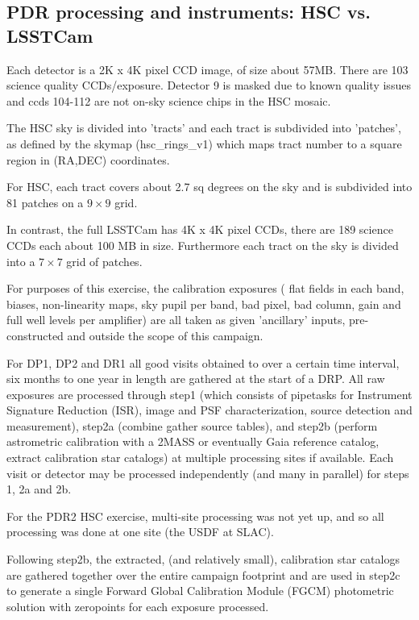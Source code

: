 \subsection{PDR processing and instruments: HSC vs. LSSTCam}

Each detector is a 2K x 4K pixel CCD image, of size about 57MB.
There are 103 science quality CCDs/exposure.  Detector 9 is masked due
to known quality issues and ccds 104-112 are not on-sky science chips in
the HSC mosaic.

The HSC sky is divided into 'tracts' and each tract is subdivided 
into 'patches', as defined by the skymap (hsc\_rings\_v1) which maps 
tract number to a square region in (RA,DEC) coordinates.

For HSC, each tract covers about 2.7 sq degrees on the sky and is
subdivided into 81 patches on a $9 \times 9$ grid.

In contrast, the full LSSTCam has 4K x 4K pixel CCDs, there are 
189 science CCDs each about 100 MB in size.  Furthermore each tract 
on the sky is divided into a $7\times 7$ grid of patches.

For purposes of this exercise, the calibration exposures (
flat fields in each band, biases, non-linearity maps, sky pupil per 
band, bad pixel, bad column,  gain and full well levels per amplifier) are 
all taken as given 'ancillary' inputs, pre-constructed and outside the
scope of this campaign.

For DP1, DP2 and DR1 all good visits obtained to over a certain time
interval, six months to one year in length are gathered at the
start of a DRP.  All raw exposures are processed through 
step1 (which consists of pipetasks for Instrument Signature 
Reduction (ISR), image and PSF characterization, source detection 
and measurement), 
step2a (combine gather source tables), and step2b (perform 
astrometric calibration with a 2MASS or eventually Gaia reference catalog,
extract calibration star catalogs) 
at multiple processing sites if available.  Each visit or detector may 
be processed independently (and many in parallel) 
for steps 1, 2a and 2b.

For the PDR2 HSC exercise, multi-site processing was not yet up, 
and so all processing was done at one site (the USDF at SLAC).

Following step2b, the extracted, (and relatively small),
calibration star catalogs are gathered together over the entire campaign
footprint and are used in step2c to generate a single Forward 
Global Calibration Module (FGCM) photometric solution with zeropoints for
each exposure processed.

